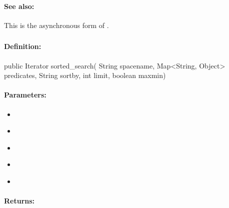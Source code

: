 \paragraph{See also:}  This is the asynchronous form of .

\pagebreak
\subsubsection{}
\label{api:java:sorted_search}


\paragraph{Definition:}
\begin{javacode}
public Iterator sorted_search(
        String spacename,
        Map<String, Object> predicates,
        String sortby,
        int limit,
        boolean maxmin)
\end{javacode}

\paragraph{Parameters:}
\begin{itemize}[noitemsep]
\item {}\\

\item {}\\

\item {}\\

\item {}\\

\item {}\\

\end{itemize}

\paragraph{Returns:}


